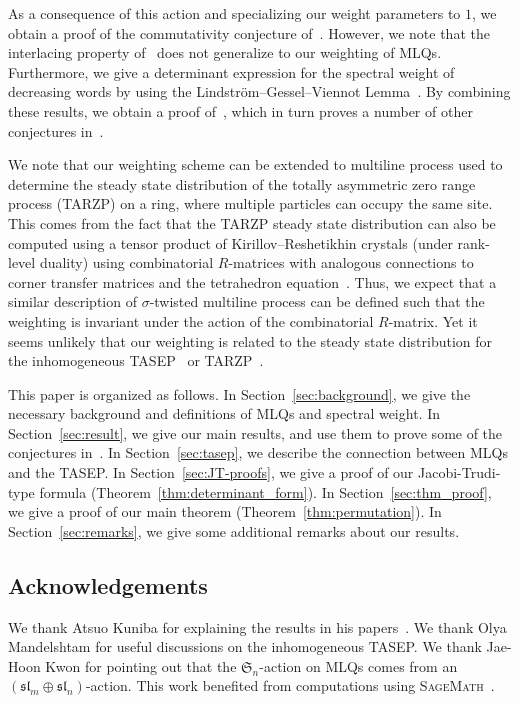 \documentclass[reqno]{amsart}
\newcommand{\0}{\phantom{c}}
\newcommand{\SymGp}[1]{\mathfrak{S}_{#1}} %
\theoremstyle{plain}
\theoremstyle{definition}
\numberwithin{equation}{section}
\begin{document}
As a consequence of this action and specializing our weight parameters to $1$, we obtain a proof of the commutativity conjecture of~\cite{AAMP}.
However, we note that the interlacing property of~\cite{AAMP} does not generalize to our weighting of MLQs.
Furthermore, we give a determinant expression for the spectral weight of decreasing words by using the Lindstr\"om--Gessel--Viennot Lemma~\cite{GV85,Lindstrom73}.
By combining these results, we obtain a proof of~\cite[Conj.~3.10]{AasLin17}, which in turn proves a number of other conjectures in~\cite{AasLin17}.

We note that our weighting scheme can be extended to multiline process used to determine the steady state distribution of the totally asymmetric zero range process (TARZP) on a ring, where multiple particles can occupy the same site.
This comes from the fact that the TARZP steady state distribution can also be computed using a tensor product of Kirillov--Reshetikhin crystals (under rank-level duality) using combinatorial $R$-matrices with analogous connections to corner transfer matrices and the tetrahedron equation~\cite{KMO16TARZP,KMO16TARZPII}.
Thus, we expect that a similar description of $\sigma$-twisted multiline process can be defined such that the weighting is invariant under the action of the combinatorial $R$-matrix.
Yet it seems unlikely that our weighting is related to the steady state distribution for the inhomogeneous TASEP~\cite{AM13,AL14} or TARZP~\cite{KMO16II}.

This paper is organized as follows.
In Section~\ref{sec:background}, we give the necessary background and definitions of MLQs and spectral weight.
In Section~\ref{sec:result}, we give our main results, and use them to prove some of the conjectures in~\cite{AasLin17}.
In Section~\ref{sec:tasep}, we describe the connection between MLQs and the TASEP.
In Section~\ref{sec:JT-proofs}, we give a proof of our Jacobi-Trudi-type formula (Theorem~\ref{thm:determinant_form}).
In Section~\ref{sec:thm_proof}, we give a proof of our main theorem (Theorem~\ref{thm:permutation}).
In Section~\ref{sec:remarks}, we give some additional remarks about our results.


\subsection{Acknowledgements}

We thank Atsuo Kuniba for explaining the results in his papers~\cite{KMO15,KMO16II,KMO16,KMO16TARZP,KMO16TARZPII}.
We thank Olya Mandelshtam for useful discussions on the inhomogeneous TASEP.
We thank Jae-Hoon Kwon for pointing out that the $\SymGp{n}$-action on MLQs comes from an $(\mathfrak{sl}_m \oplus \mathfrak{sl}_n)$-action.
This work benefited from computations using \textsc{SageMath}~\cite{sage,combinat}.
\end{document}
